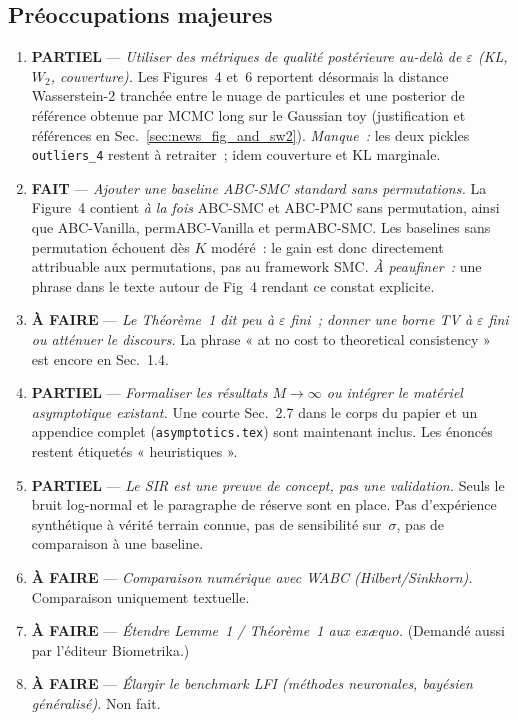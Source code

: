 \documentclass[11pt]{article}
\begin{document}
\subsection*{Préoccupations majeures}
\begin{enumerate}[leftmargin=*]
    \item[\textbf{M1.}] \textcolor{orange!85!black}{\textbf{PARTIEL}} --- \emph{Utiliser des
    métriques de qualité postérieure au-delà de $\varepsilon$ (KL, $W_2$, couverture).} Les
    Figures~4 et~6 reportent désormais la distance Wasserstein-2 tranchée entre le nuage de
    particules et une posterior de référence obtenue par MCMC long sur le Gaussian toy
    (justification et références en Sec.~\ref{sec:news_fig_and_sw2}). \emph{Manque~:} les deux
    pickles \texttt{outliers\_4} restent à retraiter~; idem couverture et KL marginale.
    \item[\textbf{M2.}] \textcolor{green!55!black}{\textbf{FAIT}} --- \emph{Ajouter une baseline
    ABC-SMC standard sans permutations.} La Figure~4 contient \emph{à la fois} ABC-SMC et
    ABC-PMC sans permutation, ainsi que ABC-Vanilla, permABC-Vanilla et permABC-SMC. Les
    baselines sans permutation échouent dès $K$ modéré~: le gain est donc directement
    attribuable aux permutations, pas au framework SMC. \emph{À peaufiner~:} une phrase dans le
    texte autour de Fig~4 rendant ce constat explicite.
    \item[\textbf{M3.}] \textcolor{red!70!black}{\textbf{À FAIRE}} --- \emph{Le Théorème~1 dit peu
    à $\varepsilon$ fini~; donner une borne TV à $\varepsilon$ fini ou atténuer le discours.} La
    phrase « at no cost to theoretical consistency » est encore en Sec.~1.4.
    \item[\textbf{M4.}] \textcolor{orange!85!black}{\textbf{PARTIEL}} --- \emph{Formaliser les
    résultats $M\to\infty$ ou intégrer le matériel asymptotique existant.} Une courte Sec.~2.7
    dans le corps du papier et un appendice complet (\texttt{asymptotics.tex}) sont maintenant
    inclus. Les énoncés restent étiquetés « heuristiques ».
    \item[\textbf{M5.}] \textcolor{orange!85!black}{\textbf{PARTIEL}} --- \emph{Le SIR est une
    preuve de concept, pas une validation.} Seuls le bruit log-normal et le paragraphe de réserve
    sont en place. Pas d'expérience synthétique à vérité terrain connue, pas de sensibilité
    sur~$\sigma$, pas de comparaison à une baseline.
    \item[\textbf{M6.}] \textcolor{red!70!black}{\textbf{À FAIRE}} --- \emph{Comparaison numérique
    avec WABC (Hilbert/Sinkhorn).} Comparaison uniquement textuelle.
    \item[\textbf{M7.}] \textcolor{red!70!black}{\textbf{À FAIRE}} --- \emph{Étendre Lemme~1 /
    Théorème~1 aux ex\ae quo.} (Demandé aussi par l'éditeur Biometrika.)
    \item[\textbf{M8.}] \textcolor{red!70!black}{\textbf{À FAIRE}} --- \emph{Élargir le benchmark
    LFI (méthodes neuronales, bayésien généralisé).} Non fait.
\end{enumerate}
\end{document}
